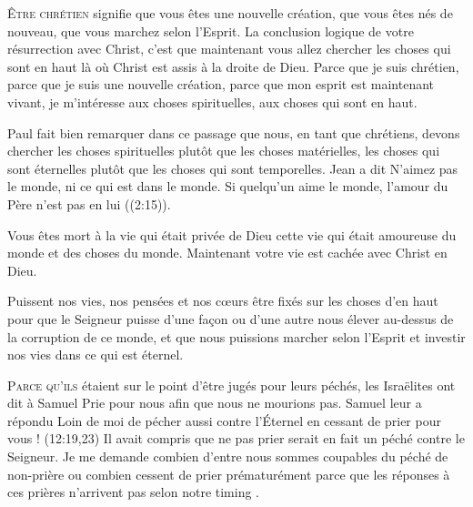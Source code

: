 \lettrine{Ê}{tre chrétien} signifie que vous êtes une nouvelle création,
 que vous êtes nés de nouveau, que vous marchez selon l'Esprit.
 La conclusion logique de votre résurrection avec Christ,
 c'est que maintenant vous allez chercher  les choses
 qui sont en haut là où Christ est assis à la droite de Dieu.
 Parce que je suis chrétien, parce que je suis une nouvelle création,
 parce que mon esprit est maintenant vivant, je m'intéresse aux choses
 spirituelles, aux choses qui sont en haut.


Paul fait bien  remarquer dans ce passage
 que nous, en tant que chrétiens, devons chercher les choses spirituelles
 plutôt que les choses matérielles, les choses qui sont éternelles plutôt
 que les choses qui sont temporelles. Jean a dit\frcolon{} 
 \Og N'aimez pas le monde, ni ce qui est dans le monde.
 Si quelqu'un aime le monde, l'amour du Père n'est pas en lui \Fg{}
 ((2:15)). 

Vous êtes mort à la vie qui était privée de Dieu
 \ocadr cette vie qui était amoureuse du monde et des choses du monde.
 Maintenant votre vie est cachée avec Christ en Dieu.

Puissent nos vies, nos pensées et nos c\oe{}urs être fixés
 sur les choses d'en haut \ocadr pour que le Seigneur puisse d'une fa\c{c}on
 ou d'une autre nous élever au-dessus de la corruption de ce monde,
 et que nous puissions marcher selon l'Esprit et investir nos vies
 dans ce qui est éternel.

\dvrule






\lettrine{P}{arce qu'ils} étaient sur le point d'être jugés pour leurs péchés,
 les Israëlites ont dit à Samuel\frcolon{} 
 \Og Prie pour nous afin que nous ne mourions pas. \Fg{} 
 Samuel leur a répondu\frcolon{} 
 \Og Loin de moi de pécher aussi contre l'Éternel en cessant de prier
 pour vous ! \Fg{}
 (12:19,23)
 Il avait compris que ne pas prier serait en fait un péché contre le Seigneur.
 Je me demande combien d'entre nous sommes coupables du péché de
 \Og non-prière \Fg{} ou combien cessent de prier prématurément
 parce que les réponses à ces prières n'arrivent pas
 selon notre \Og timing \Fg{}.

